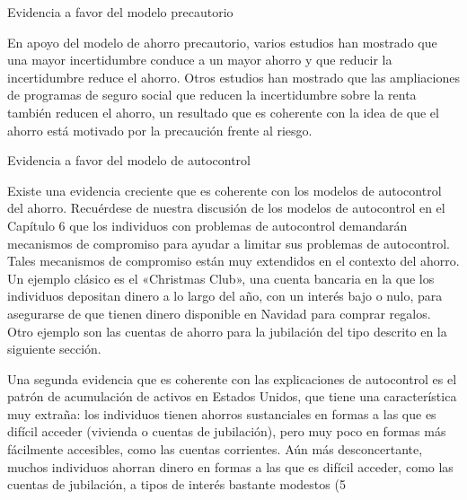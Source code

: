\documentclass[10pt,a4paper]{article}
\begin{document}
Evidencia a favor del modelo precautorio

En apoyo del modelo de ahorro precautorio, varios estudios han mostrado que una mayor incertidumbre conduce a un mayor ahorro y que reducir la incertidumbre reduce el ahorro. Otros estudios han mostrado que las ampliaciones de programas de seguro social que reducen la incertidumbre sobre la renta también reducen el ahorro, un resultado que es coherente con la idea de que el ahorro está motivado por la precaución frente al riesgo.

Evidencia a favor del modelo de autocontrol

Existe una evidencia creciente que es coherente con los modelos de autocontrol del ahorro. Recuérdese de nuestra discusión de los modelos de autocontrol en el Capítulo 6 que los individuos con problemas de autocontrol demandarán mecanismos de compromiso para ayudar a limitar sus problemas de autocontrol. Tales mecanismos de compromiso están muy extendidos en el contexto del ahorro. Un ejemplo clásico es el «Christmas Club», una cuenta bancaria en la que los individuos depositan dinero a lo largo del año, con un interés bajo o nulo, para asegurarse de que tienen dinero disponible en Navidad para comprar regalos. Otro ejemplo son las cuentas de ahorro para la jubilación del tipo descrito en la siguiente sección.

Una segunda evidencia que es coherente con las explicaciones de autocontrol es el patrón de acumulación de activos en Estados Unidos, que tiene una característica muy extraña: los individuos tienen ahorros sustanciales en formas a las que es difícil acceder (vivienda o cuentas de jubilación), pero muy poco en formas más fácilmente accesibles, como las cuentas corrientes. Aún más desconcertante, muchos individuos ahorran dinero en formas a las que es difícil acceder, como las cuentas de jubilación, a tipos de interés bastante modestos (5 %
\end{document}
